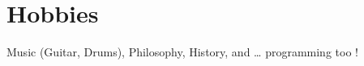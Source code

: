 \section{Hobbies}
    \resumeSubHeadingListStart
        \renewcommand{\labelitemi}{-}
        \setlength{\itemindent}{-15pt}
        \item{Music (Guitar, Drums), Philosophy, History, and … programming too !}
    \resumeSubHeadingListEnd